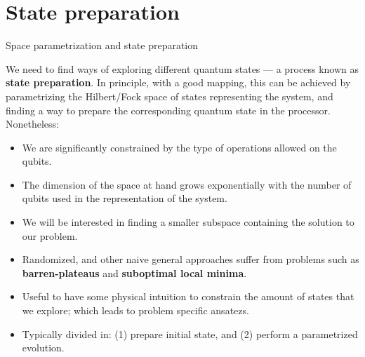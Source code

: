 
\section{State preparation}


\begin{frame}[allowframebreaks]{Space parametrization and state preparation}

  We need to find ways of exploring different quantum states --- a process known as \textbf{state preparation}. In principle, with a good mapping, this can be achieved by parametrizing the Hilbert/Fock space of states representing the system, and finding a way to prepare the corresponding quantum state in the processor. Nonetheless:

  \begin{itemize}
    \item<2-> We are significantly constrained by the type of operations allowed on the qubits.
    \item<3-> The dimension of the space at hand grows exponentially with the number of qubits used in the representation of the system.
    \item<3-> We will be interested in finding a smaller subspace containing the solution to our problem.
    \item<4-> Randomized, and other naive general approaches suffer from problems such as \textbf{barren-plateaus} and \textbf{suboptimal local minima}.
    \item<4-> Useful to have some physical intuition to constrain the amount of states that we explore; which leads to problem specific ansatezs.
    \item Typically divided in: (1) prepare initial state, and (2) perform a parametrized evolution.
  \end{itemize}

\end{frame}

